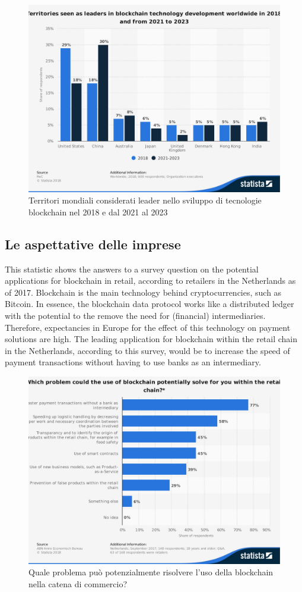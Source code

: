 \begin{figure}[H]
	\centering
	\includegraphics[width=.75\linewidth]{images/chap_intro/leading-territories-worldwide.pdf}
	\caption{Territori mondiali considerati leader nello sviluppo di tecnologie blockchain
		nel 2018 e dal 2021 al 2023
		\cite{leading-territories-worldwide}}
	\label{fig:leading-territories-worldwide}
\end{figure}

\subsection{Le aspettative delle imprese}

This statistic shows the answers to a survey question on the potential
applications for blockchain in retail, according to retailers in the Netherlands as of 2017.
Blockchain is the main technology behind cryptocurrencies, such as Bitcoin. In essence,
the blockchain data protocol works like a distributed ledger with the potential to the
remove the need for (financial) intermediaries. Therefore, expectancies in Europe for
the effect of this technology on payment solutions are high. The leading application
for blockchain within the retail chain in the Netherlands, according to this survey,
would be to increase the speed of payment transactions without having to use banks as an intermediary.
\begin{figure}[H]
	\centering
	\includegraphics[width=.75\linewidth]{images/chap_intro/potential-blockchain-applications.pdf}
	\caption{Quale problema può potenzialmente risolvere l'uso della blockchain
		nella catena di commercio? \cite{potential-blockchain-applications}}
	\label{fig:potential-blockchain-applications}
\end{figure}

